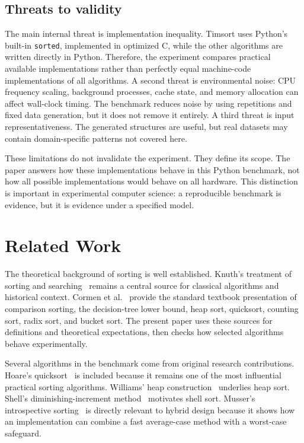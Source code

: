 \documentclass[11pt,a4paper]{article}
\begin{document}
\subsection{Threats to validity}

The main internal threat is implementation inequality. Timsort uses Python's built-in \texttt{sorted}, implemented in optimized C, while the other algorithms are written directly in Python. Therefore, the experiment compares practical available implementations rather than perfectly equal machine-code implementations of all algorithms. A second threat is environmental noise: CPU frequency scaling, background processes, cache state, and memory allocation can affect wall-clock timing. The benchmark reduces noise by using repetitions and fixed data generation, but it does not remove it entirely. A third threat is input representativeness. The generated structures are useful, but real datasets may contain domain-specific patterns not covered here.

These limitations do not invalidate the experiment. They define its scope. The paper answers how these implementations behave in this Python benchmark, not how all possible implementations would behave on all hardware. This distinction is important in experimental computer science: a reproducible benchmark is evidence, but it is evidence under a specified model.

\section{Related Work}\label{sec:related}

The theoretical background of sorting is well established. Knuth's treatment of sorting and searching~\cite{knuth1998} remains a central source for classical algorithms and historical context. Cormen et al.~\cite{cormen2009} provide the standard textbook presentation of comparison sorting, the decision-tree lower bound, heap sort, quicksort, counting sort, radix sort, and bucket sort. The present paper uses these sources for definitions and theoretical expectations, then checks how selected algorithms behave experimentally.

Several algorithms in the benchmark come from original research contributions. Hoare's quicksort~\cite{hoare1962} is included because it remains one of the most influential practical sorting algorithms. Williams' heap construction~\cite{williams1964} underlies heap sort. Shell's diminishing-increment method~\cite{shell1959} motivates shell sort. Musser's introspective sorting~\cite{musser1997} is directly relevant to hybrid design because it shows how an implementation can combine a fast average-case method with a worst-case safeguard.
\end{document}
